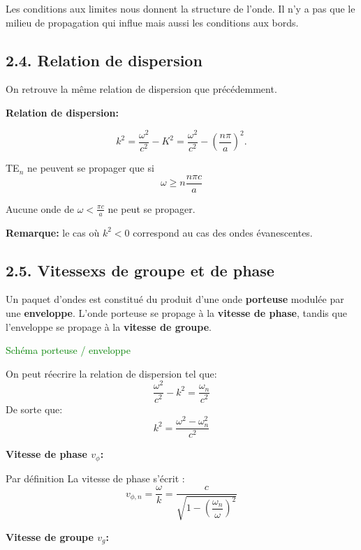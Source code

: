 \documentclass[french, a4paper, 10pt, twocolumn, landscape]{article}
\begin{document}
Les conditions aux limites nous donnent la structure de l'onde. Il n'y a pas que le milieu de propagation qui influe mais aussi les conditions aux bords. 

\subsection*{2.4. Relation de dispersion}

On retrouve la même relation de dispersion que précédemment.

	\textbf{Relation de dispersion:}\medskip

	\begin{equation}
		k^2  = \frac{\omega^2}{c^2}-K^2 = \frac{\omega^2}{c^2} - \left(\frac{n\pi}{a}\right)^2.
	\end{equation}


	TE$_n$ ne peuvent se propager que si \[\omega \geq n \frac{n\pi c}{a}\]

	\noindent Aucune onde de $\omega < \frac{\pi c}{a}$ ne peut se propager.

\textbf{Remarque:}
	le cas où $k^2<0$ correspond au cas des ondes évanescentes.

\subsection*{2.5. Vitessexs de groupe et de phase}

Un paquet d'ondes est constitué du produit d'une onde \textbf{porteuse} modulée par une \textbf{enveloppe}. L'onde porteuse se propage à la \textbf{vitesse de phase}, tandis que l'enveloppe se propage à la \textbf{vitesse de groupe}.\medskip

\textcolor{green}{Schéma porteuse / enveloppe}\medskip


\noindent On peut réecrire la relation de dispersion tel que: 
\[\frac{\omega^2}{c^2}-k^2=\frac{\omega_n}{c^2}\]
De sorte que: 
\begin{equation}
	k^2 = \frac{\omega^2-\omega_n^2}{c^2}
\end{equation}


	\noindent\textbf{Vitesse de phase $v_{\phi}$:}\medskip

	Par définition La vitesse de phase s'écrit : 
	\begin{equation}
	v_{\phi, n} = \frac{\omega}{k} =\frac{c}{\sqrt{1-\left(\dfrac{\omega_n}{\omega}\right)^2}}
	\end{equation}

	\noindent\textbf{Vitesse de groupe $v_g$:}\medskip 
\end{document}
